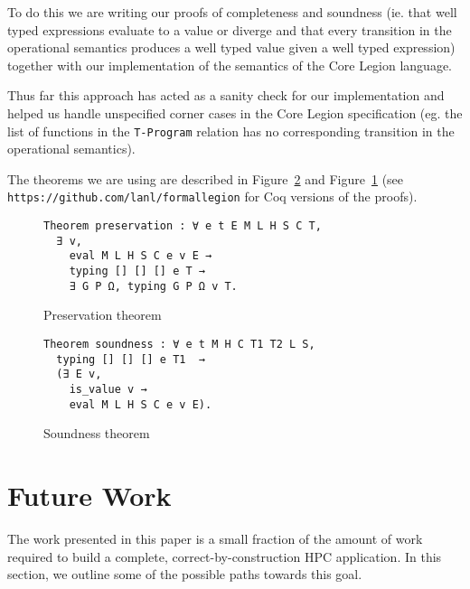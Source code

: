 \documentclass[sigconf]{acmart}
\begin{document}
To do this we are writing our proofs of completeness and soundness (ie. that well
typed expressions evaluate to a value or diverge and that every transition in
the operational semantics produces a well typed value given a well typed
expression) together with our implementation of the semantics of the Core
Legion language.

Thus far this approach has acted as a sanity check for our implementation and
helped us handle unspecified corner cases in the Core Legion specification (eg.
the list of functions in the \texttt{T-Program} relation has no corresponding
transition in the operational semantics). 

The theorems we are using are described in Figure~\ref{soundnesstheorem} and
Figure~\ref{preservationtheorem} (see \texttt{https://github.com/lanl/formallegion}
for Coq versions of the proofs). 

\begin{figure}
\begin{BVerbatim}
Theorem preservation : ∀ e t E M L H S C T,
  ∃ v,
    eval M L H S C e v E →
    typing [] [] [] e T → 
    ∃ G P Ω, typing G P Ω v T.
\end{BVerbatim}
\caption{Preservation theorem}
\label{preservationtheorem}
\end{figure}

\begin{figure}
\begin{BVerbatim}
Theorem soundness : ∀ e t M H C T1 T2 L S,
  typing [] [] [] e T1  →
  (∃ E v,
    is_value v →
    eval M L H S C e v E).
\end{BVerbatim}
\caption{Soundness theorem}
\label{soundnesstheorem}
\end{figure}


\section{Future Work}

The work presented in this paper is a small fraction of the
amount of work required to build a complete, correct-by-construction HPC
application. In this section, we outline some of the possible paths towards
this goal. 
\end{document}
